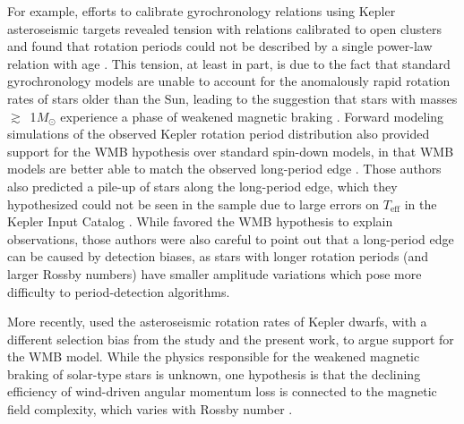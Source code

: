 \documentclass[twocolumn]{aastex631}
\newcommand{\teff}{\ensuremath{T_{\mathrm{eff}}}\xspace}
\newcommand{\msun}{$M_\odot$\xspace}
\begin{document}
For example, efforts to calibrate gyrochronology relations using Kepler asteroseismic targets revealed tension with relations calibrated to open clusters and found that rotation periods could not be described by a single power-law relation with age \citep{Angus2015}. This tension, at least in part, is due to the fact that standard gyrochronology models are unable to account for the anomalously rapid rotation rates of stars older than the Sun, leading to the suggestion that stars with masses $\gtrsim$~1\msun experience a phase of weakened magnetic braking \citep[WMB,][]{vanSaders2016}. Forward modeling simulations of the observed Kepler rotation period distribution also provided support for the WMB hypothesis over standard spin-down models, in that WMB models are better able to match the observed long-period edge \citep{vanSaders2019}. Those authors also predicted a pile-up of stars along the long-period edge, which they hypothesized could not be seen in the \citet{McQuillan2014} sample due to large errors on \teff in the Kepler Input Catalog \citep[KIC,][]{Brown2011}. While \citet{vanSaders2019} favored the WMB hypothesis to explain observations, those authors were also careful to point out that a long-period edge can be caused by detection biases, as stars with longer rotation periods (and larger Rossby numbers) have smaller amplitude variations which pose more difficulty to period-detection algorithms. 

More recently, \citet{Hall2021} used the asteroseismic rotation rates of Kepler dwarfs, with a different selection bias from the \citet{vanSaders2019} study and the present work, to argue support for the WMB model. While the physics responsible for the weakened magnetic braking of solar-type stars is unknown, one hypothesis is that the declining efficiency of wind-driven angular momentum loss is connected to the magnetic field complexity, which varies with Rossby number \citep[e.g.][]{Reville2015, vanSaders2016, Garraffo2016, Metcalfe2016, Metcalfe2019}.  



\end{document}
